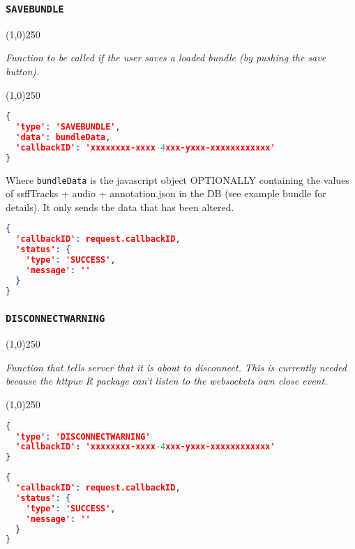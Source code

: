 \documentclass[A4,12pt, utf8]{article}
\begin{document}
\subsubsection{\texttt{SAVEBUNDLE}}
\begin{center}
  \line(1,0){250}

  \textit{Function to be called if the user saves a loaded bundle (by pushing the save button).}

  \line(1,0){250}
\end{center}


\begin{lstlisting}[caption=Request content, language=json]
{
  'type': 'SAVEBUNDLE',
  'data': bundleData,
  'callbackID': 'xxxxxxxx-xxxx-4xxx-yxxx-xxxxxxxxxxxx'
}
\end{lstlisting}
Where \texttt{bundleData} is the javascript object OPTIONALLY containing the values of ssffTracks + audio + annotation.json in the DB (see example bundle for details). It only sends the data that has been altered.

\begin{lstlisting}[caption=Reply content, language=json]
{
  'callbackID': request.callbackID,
  'status': {
    'type': 'SUCCESS',
    'message': ''
  }
}
\end{lstlisting}


\subsubsection{\texttt{DISCONNECTWARNING}}
\begin{center}
  \line(1,0){250}

  \textit{Function that tells server that it is about to disconnect. This is currently needed because the httpuv R package can't listen to the websockets own close event.}

  \line(1,0){250}
\end{center}


\begin{lstlisting}[caption=Request content, language=json]
{
  'type': 'DISCONNECTWARNING'
  'callbackID': 'xxxxxxxx-xxxx-4xxx-yxxx-xxxxxxxxxxxx'
}
\end{lstlisting}

\begin{lstlisting}[caption=Reply content, language=json]
{
  'callbackID': request.callbackID,
  'status': {
    'type': 'SUCCESS',
    'message': ''
  }
}
\end{lstlisting}
\end{document}
